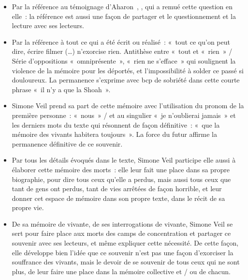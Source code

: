 {\begin{itemize}
\item Par la référence au témoignage d'Aharon~, , qui a remué cette
question en elle~: la référence est aussi une façon de partager et le questionnement et la lecture
avec ses lecteurs.
\item Par la référence à tout ce qui a été écrit ou réalisé~: «~tout ce qu'on peut dire, écrire filmer
(…) n'exorcise rien. Antithèse entre «~tout et «~rien~» / Série d'oppositions «~omniprésente~»,
«~rien ne s'efface~» qui soulignent la violence de la mémoire pour les déportés, et l'impossibilité
à solder ce passé si douloureux. La permanence s'exprime avec bcp de sobriété dans cette
courte phrase «~il n'y a que la Shoah~».
\item Simone Veil prend sa part de cette mémoire avec l'utilisation du pronom de la première
personne~: «~nous~» / et au singulier «~je n'oublierai jamais~» et les derniers mots du texte qui
résonnent de façon définitive~: «~que la mémoire des vivants habitera toujours~». La force du futur
affirme la permanence définitive de ce souvenir.
\item Par tous les détails évoqués dans le texte, Simone Veil participe elle aussi à élaborer
cette mémoire des morts~: elle leur fait une place dans sa propre biographie, pour dire tous ceux
qu'elle a perdus, mais aussi tous ceux que tant de gens ont perdus, tant de vies arrêtées de façon
horrible, et leur donner cet espace de mémoire dans son propre texte, dans le récit de sa propre
vie.
\item De sa mémoire de vivante, de ses interrogations de vivante, Simone Veil se sert pour
faire place aux morts des camps de concentration et partager ce souvenir avec ses lecteurs, et
même expliquer cette nécessité. De cette façon, elle développe bien l'idée que ce souvenir n'est
pas une façon d'exorciser la souffrance des vivants, mais le devoir de se souvenir de tous ceux
qui ne sont plus, de leur faire une place dans la mémoire collective et / ou de chacun.
\end{itemize}}%

